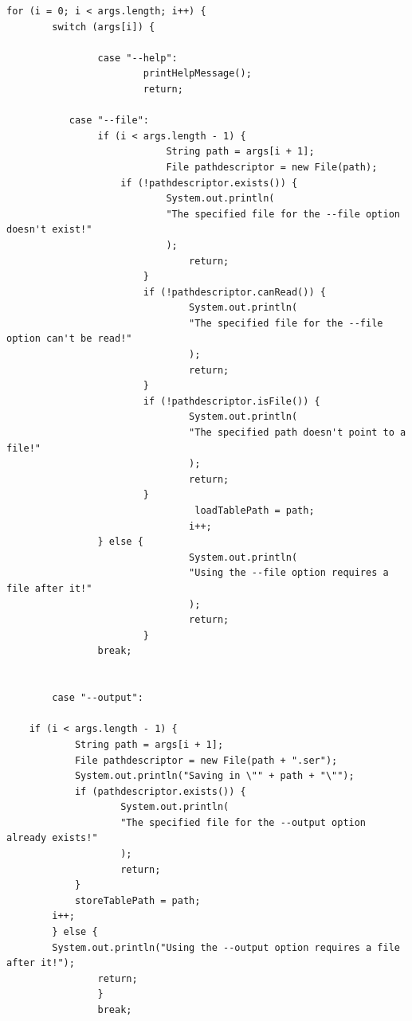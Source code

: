 \documentclass[11pt]{article}
\begin{document}
\begin{lstlisting}[caption=Überprüfung der Programmparameter, label=lst:checkParameter]
for (i = 0; i < args.length; i++) {
        switch (args[i]) {
        
                case "--help":
                        printHelpMessage();
                        return;
                        
           case "--file":
                if (i < args.length - 1) {
                            String path = args[i + 1];
                            File pathdescriptor = new File(path);
                    if (!pathdescriptor.exists()) {
                            System.out.println(
                            "The specified file for the --file option doesn't exist!"
                            );
                                return;
                        }
                        if (!pathdescriptor.canRead()) {
                                System.out.println(
                                "The specified file for the --file option can't be read!"
                                );
                                return;
                        }
                        if (!pathdescriptor.isFile()) {
                                System.out.println(
                                "The specified path doesn't point to a file!"
                                );
                                return;
                        }
                                 loadTablePath = path;
                                i++;
                } else {
                                System.out.println(
                                "Using the --file option requires a file after it!"
                                );
                                return;
                        }
                break;


        case "--output":
        
    if (i < args.length - 1) {
            String path = args[i + 1];
            File pathdescriptor = new File(path + ".ser");
            System.out.println("Saving in \"" + path + "\"");
            if (pathdescriptor.exists()) {
                    System.out.println(
                    "The specified file for the --output option already exists!"
                    );
                    return;
            }
            storeTablePath = path;
        i++;
        } else {
        System.out.println("Using the --output option requires a file after it!");
                return;
                }
                break;


\end{lstlisting}
\end{document}
